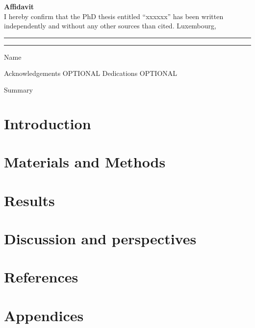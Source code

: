 \documentclass[11pt,a4paper]{report}
\begin{document}
\newpage

\noindent \textbf{\large{Affidavit}}\\
\newline
I hereby confirm that the PhD thesis entitled “xxxxxx” has been written independently and without any other sources than cited.
\vspace{2.5cm}
\newline
\noindent Luxembourg, \rule{4cm}{0.4pt}  \hspace{2cm} \rule{6cm}{0.4pt}
\newline 
\hspace*{9cm} Name


\newpage
Acknowledgements OPTIONAL
\newpage
Dedications OPTIONAL
\newpage
\renewcommand*\contentsname{Index}
\tableofcontents
\newpage
\listoffigures
\listoftables
\newpage
Summary
\newpage


\setcounter{page}{1}

\chapter{Introduction}


\chapter{Materials and Methods}


\chapter{Results}


\chapter{Discussion and perspectives}


\chapter*{References}
\printbibliography[heading=none]
\chapter*{Appendices}
\end{document}
